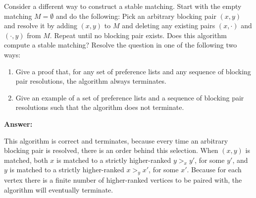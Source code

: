 \documentclass{article}
\begin{document}
Consider a different way to construct a stable matching. Start with the empty matching $M = \emptyset$ and do the following: Pick an arbitrary blocking pair $(x, y)$ and resolve it by adding $(x, y)$ to $M$ and deleting any existing pairs $(x, \cdot)$ and $(\cdot, y)$ from $M$. Repeat until no blocking pair exists. Does this algorithm compute a stable matching? Resolve the question in one of the following two ways:

\begin{enumerate}
\item Give a proof that, for any set of preference lists and any sequence of blocking pair resolutions, the algorithm always terminates.
\item Give an example of a set of preference lists and a sequence of blocking pair resolutions such that the algorithm does not terminate.
\end{enumerate}


\bigskip \noindent \textbf{Answer:}

This algorithm is correct and terminates, because every time an arbitrary blocking pair is resolved, there is an order behind this selection. When $(x,y)$ is matched, both $x$ is matched to a strictly higher-ranked $y >_x y'$, for some $y'$, and $y$ is matched to a strictly higher-ranked $x >_y x'$, for some $x'$.
Because for each vertex there is a finite number of higher-ranked vertices to be paired with, the algorithm will eventually terminate.
\end{document}
